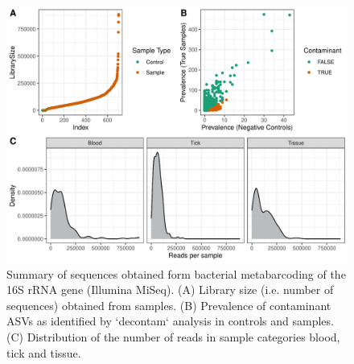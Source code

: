 \documentclass[a4paper, nobind]{templates/ociamthesis}
\begin{document}
\begin{figure}
\includegraphics[width=0.95\linewidth]{figures/ms-figs-appendix/FigA-3.1} \caption[Summary of sequences obtained from bacterial metabarcoding of the 16S rRNA gene.]{Summary of sequences obtained form bacterial metabarcoding of the 16S rRNA gene (Illumina MiSeq). (A) Library size (i.e. number of sequences) obtained from samples. (B) Prevalence of contaminant ASVs as identified by `decontam` analysis in controls and samples. (C) Distribution of the number of reads in sample categories blood, tick and tissue.}\label{fig:FA31}
\end{figure}

\newpage
\end{document}
